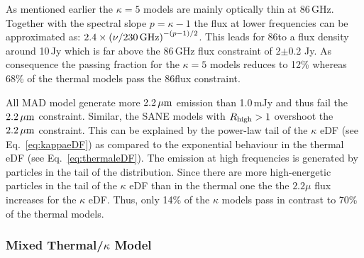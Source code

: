 As mentioned earlier the $\kappa=5$ models are mainly optically thin at 86\,GHz.
Together with the spectral slope $p=\kappa-1$ the flux at lower frequencies can be approximated as: $2.4\times \left(\nu/230\,\rm{GHz}\right)^{-(p-1)/2}$.
This leads for 86\GHz to a flux density around 10\,Jy which is far above the 86\,GHz flux constraint of 2$\pm$0.2 Jy.
As consequence the passing fraction for the $\kappa=5$ models reduces to 12\% whereas 68\% of the thermal models pass the 86\GHz flux constraint.


All MAD model generate more $2.2\,\mu\mathrm{m}$ emission than 1.0\,mJy and thus fail the $2.2\,\mu\mathrm{m}$ constraint.
Similar, the SANE models with $R_{\rm high}>1$ overshoot the $2.2\,\mu\mathrm{m}$ constraint.
This can be explained by the power-law tail of the $\kappa$ eDF (see Eq.~\ref{eq:kappaeDF}) as compared to the exponential behaviour in the thermal eDF (see Eq.~\ref{eq:thermaleDF}).
The emission at high frequencies is generated by particles in the tail of the distribution.
Since there are more high-energetic particles in the tail of the $\kappa$ eDF than in the thermal one the the $2.2\mu$ flux increases for the $\kappa$ eDF.
Thus, only 14\% of the $\kappa$ models pass in contrast to 70\% of the thermal models.

\subsubsection{Mixed Thermal/\texorpdfstring{$\kappa$}{kappa} Model}

